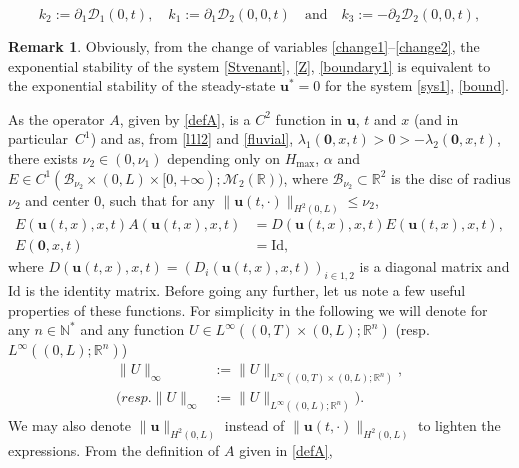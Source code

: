 \documentclass[11pt]{article}
\newcommand{\resp}{resp.\xspace}
\numberwithin{equation}{section}
\let\mathcal\mathscr
\theoremstyle{definition}
\newtheorem{rmk}[thm]{Remark}
\begin{document}
\[
k_{2}:=\partial_{1} \mathcal{D}_{1}(0,t),\quad k_{1}:=\partial_{1}\mathcal{D}_{2}(0,0,t)\quad\text{and}\quad k_{3}:=-\partial_{2}\mathcal{D}_{2}(0,0,t),
\]
\begin{rmk}
Obviously, from the change of variables \eqref{change1}--\eqref{change2}, the exponential stability of
the system \eqref{Stvenant}, \eqref{Z}, \eqref{boundary1}
is equivalent to the exponential stability of the steady-state $\boldsymbol{u}^{*}=0$ for the system \eqref{sys1}, \eqref{bound}.
\label{r1}
\end{rmk}
As the operator $A$, given by \eqref{defA}, is a {$C^{2}$ function in $\boldsymbol{u}$,
$t$ and $x$ (and {in particular~$C^{1}$})}
and as, from \eqref{l1l2} and \eqref{fluvial}, $\lambda_{1}(\boldsymbol{0},x,t)>0>-\lambda_{2}(\boldsymbol{0},x,t)$,
there exists $\nu_{2}\in(0,\nu_{1})$ {depending only on $H_{\max}$, $\alpha$}
and $E\in C^{1}(\mathcal{B}_{\nu_{2}}\times(0,L)\times[0,+\infty);\mathcal{M}_{2}(\mathbb{R}))$, where
$\mathcal{B}_{\nu_{2}}\subset\mathbb{R}^{2}$ is the disc of radius $\nu_{2}$ and center $0$,
such that
for any $\lVert\boldsymbol{u}(t,\cdot)\rVert_{H^{2}(0,L)}\leq \nu_{2}$,
\begin{equation}
\begin{split}
E(\boldsymbol{u}(t,x),x,t)A(\boldsymbol{u}(t,x),x,t)&=D(\boldsymbol{u}(t,x),x,t)E(\boldsymbol{u}(t,x),x,t),\\
E(\boldsymbol{0},x,t)&=\mathrm{Id},
\end{split}
\label{definv}
\end{equation}
where $D(\boldsymbol{u}(t,x),x,t)=(D_{i}(\boldsymbol{u}(t,x),x,t))_{i\in{1,2}}$ is a diagonal matrix and $\mathrm{Id}$ is the identity matrix.
Before going any further, let us
note a few useful properties of these functions. {For simplicity in the following we will denote for any $n\in\mathbb{N}^{*}$ and any function $U\in L^{\infty}((0,T)\times(0,L);\mathbb{R}^{n})$ (resp. $L^{\infty}((0,L);\mathbb{R}^{n})$)
\begin{equation*}
\begin{split}
\lVert U\rVert_{\infty}&:=\lVert U\rVert_{L^{\infty}((0,T)\times(0,L);\mathbb{R}^{n})},\\
(\resp\lVert U\rVert_{\infty}&:=\lVert U\rVert_{L^{\infty}((0,L);\mathbb{R}^{n})}).
\end{split}
\end{equation*}
We may also denote $\lVert\boldsymbol{u}\rVert_{H^{2}(0,L)}$ instead of $\lVert\boldsymbol{u}(t,\cdot)\rVert_{H^{2}(0,L)}$ to lighten the expressions.}
From the definition of $A$ given in \eqref{defA},
\end{document}
